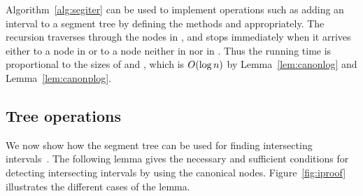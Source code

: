 \documentclass[english,gradu]{tktltiki2018}
\begin{document}
Algorithm~\ref{alg:segiter} can be used to implement operations such as adding an interval to a segment tree by defining the methods \visitc and \visitp appropriately.
The recursion traverses through the nodes in , and stops immediately when it arrives either to a node in  or to a node neither in  nor in .
Thus the running time is proportional to the sizes of  and , which is $O(\log n)$ by Lemma~\ref{lem:canonlog} and Lemma~\ref{lem:canonplog}.

\subsection{Tree operations}\label{sec:treeops}

We now show how the segment tree can be used for finding intersecting intervals~\cite[Chapter 10]{berg2008}.
The following lemma gives the necessary and sufficient conditions for detecting intersecting intervals by using the canonical nodes.
Figure~\ref{fig:iproof} illustrates the different cases of the lemma.
\end{document}
